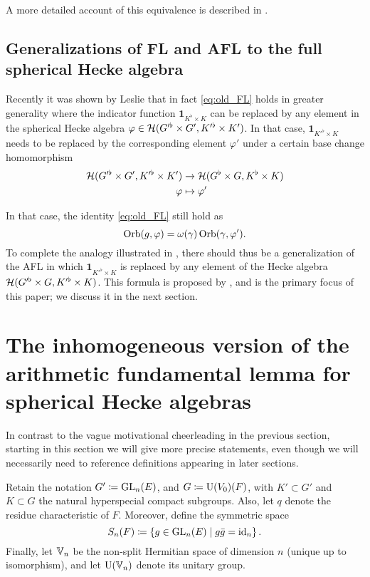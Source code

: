 A more detailed account of this equivalence is described in \cite[\S1.4]{ref:liuFJ}.

\subsection{Generalizations of FL and AFL to the full spherical Hecke algebra}
Recently it was shown by Leslie \cite{ref:leslie} that in fact
\eqref{eq:old_FL} holds in greater generality where the indicator function
$\mathbf{1}_{K^\flat \times K}$ can be replaced by any element in the spherical
Hecke algebra $\varphi \in \mathcal H(G'^\flat \times G', K'^\flat \times K')$.
In that case, $\mathbf{1}_{K'^\flat \times K}$ needs to be replaced
by the corresponding element $\varphi'$ under a certain base change homomorphism
\begin{align*}
  \mathcal H(G'^\flat \times G', K'^\flat \times K') &\to \mathcal H(G^\flat \times G, K^\flat \times K) \\
  \varphi &\mapsto \varphi'
\end{align*}

In that case, the identity \eqref{eq:old_FL} still hold as
\begin{equation}
  \operatorname{Orb}(g, \varphi) = \omega(\gamma) \operatorname{Orb}(\gamma, \varphi').
  \label{eq:eq:leslie_FL}
\end{equation}
To complete the analogy illustrated in ,
there should thus be a generalization of the AFL in which
$\mathbf{1}_{K'^\flat \times K}$ is replaced by any element of the Hecke algebra
$\mathcal H(G'^\flat \times G, K'^\flat \times K)$.
This formula is proposed by \cite{ref:AFLspherical},
and is the primary focus of this paper; we discuss it in the next section.

\section{The inhomogeneous version of the arithmetic fundamental lemma for spherical Hecke algebras}
In contrast to the vague motivational cheerleading in the previous section,
starting in this section we will give more precise statements,
even though we will necessarily need to reference definitions appearing in later sections.

Retain the notation $G' \coloneqq \operatorname{GL}_n(E)$, and $G \coloneqq \operatorname{U}(V_0)(F)$,
with $K' \subset G'$ and $K \subset G$ the natural hyperspecial compact subgroups.
Also, let $q$ denote the residue characteristic of $F$.
Moreover, define the symmetric space
\[ S_n(F) \coloneqq \left\{ g \in \operatorname{GL}_n(E) \mid g \bar{g} = \operatorname{id}_n \right\}. \]
Finally, let $\mathbb V_n$ be the non-split Hermitian space of dimension $n$ (unique up to isomorphism),
and let $\operatorname{U}(\mathbb V_n)$ denote its unitary group.

